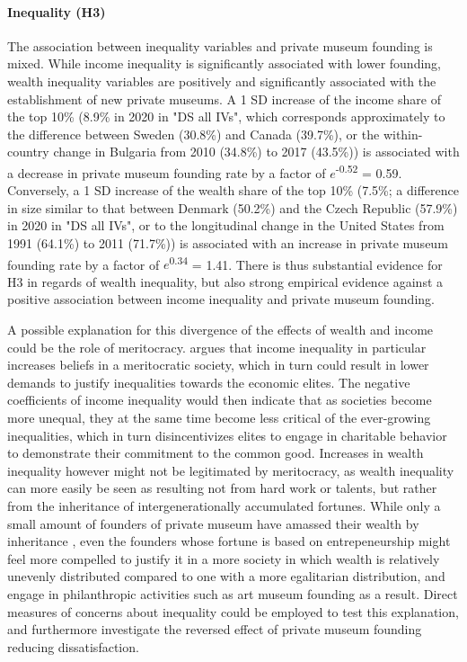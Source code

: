 \documentclass[11pt]{article}
\begin{document}
\paragraph*{Inequality (H3)}



The association between inequality variables and private museum founding is mixed.
While income inequality is significantly associated with lower founding, wealth inequality variables are positively and significantly associated with the establishment of new private museums. 
A 1 SD increase of the income share of the top 10\% (8.9\% in 2020 in "DS all IVs", which corresponds approximately to the difference between Sweden (30.8\%) and Canada (39.7\%), or the within-country change in Bulgaria from 2010 (34.8\%) to 2017 (43.5\%)) is associated with a decrease in private museum founding rate by a factor of \(e\)\textsuperscript{-0.52} = 0.59. 
Conversely, a 1 SD increase of the wealth share of the top 10\% (7.5\%; a difference in size similar to that between Denmark (50.2\%) and the Czech Republic (57.9\%) in 2020 in "DS all IVs", or to the longitudinal change in the United States from 1991 (64.1\%) to 2011 (71.7\%)) is associated with an increase in private museum founding rate by a factor of \(e\)\textsuperscript{0.34} = 1.41.
There is thus substantial evidence for H3 in regards of wealth inequality, but also strong empirical evidence against a positive association between income inequality and private museum founding. 


A possible explanation for this divergence of the effects of wealth and income could be the role of meritocracy.
\textcite{Mijs_2019_paradox} argues that income inequality in particular increases beliefs in a meritocratic society, which in turn could result in lower demands to justify inequalities towards the economic elites.
The negative coefficients of income inequality would then indicate that as societies become more unequal, they at the same time become less critical of the ever-growing inequalities, which in turn disincentivizes elites to engage in charitable behavior to demonstrate their commitment to the common good. 
Increases in wealth inequality however might not be legitimated by meritocracy, as wealth inequality can more easily be seen as resulting not from hard work or talents, but rather from the inheritance of intergenerationally accumulated fortunes.
While only a small amount of founders of private museum have amassed their wealth by inheritance \parencite{Velthuis_etal_2023_boom}, even the founders whose fortune is based on entrepeneurship might feel more compelled to justify it in a more society in which wealth is relatively unevenly distributed compared to one with a more egalitarian distribution, and engage in philanthropic activities such as art museum founding as a result.
Direct measures of concerns about inequality could be employed to test this explanation, and furthermore investigate the reversed effect of private museum founding reducing dissatisfaction.
\end{document}

